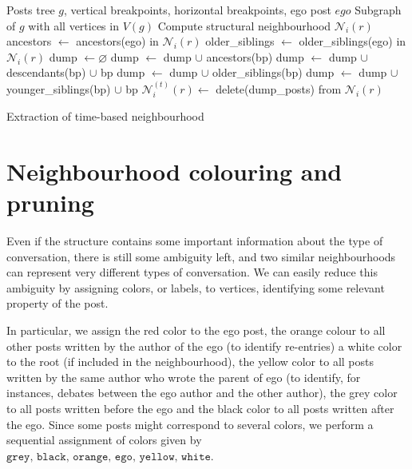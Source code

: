 \documentclass[conference]{IEEEtran}
\begin{document}
\begin{algorithm}[H]
\begin{algorithmic}
\REQUIRE Posts tree $g$, vertical breakpoints, horizontal breakpoints, ego post $ego$
\ENSURE Subgraph of $g$ with all vertices in $V(g)$
\STATE Compute structural neighbourhood $\mathcal{N}_i(r)$
\STATE ancestors $\leftarrow$  ancestors(ego) in $\mathcal{N}_i(r)$
\STATE older\_siblings $\leftarrow$ older\_siblings(ego) in $\mathcal{N}_i(r)$
\STATE dump $\leftarrow \varnothing$
   \STATE dump $\leftarrow$ dump $\cup$ ancestors(bp)
 \ELSE
   \STATE dump $\leftarrow$ dump $\cup$ descendants(bp) $\cup$ bp
  \ENDIF
\ENDFOR
{}
     \STATE dump $\leftarrow$ dump $\cup$ older\_siblings(bp)
   \ELSE
     \STATE dump $\leftarrow$ dump $\cup$ younger\_siblings(bp) $\cup$ bp
  \ENDIF
\ENDFOR
\STATE $\mathcal{N}_i^{(t)}(r) \leftarrow$ delete(dump\_posts) from $\mathcal{N}_i(r)$
\end{algorithmic}
\caption{Extraction of time-based neighbourhood}
\label{alg:temporal_neighbourhood}
\end{algorithm}

\section{Neighbourhood colouring and pruning}\label{sec:colouring_pruning}
Even if the structure contains some important information about the type of conversation, there is still some ambiguity left, and two similar neighbourhoods can represent very different types of conversation. We can easily reduce this ambiguity by assigning colors, or labels, to vertices, identifying some relevant property of the post. 

In particular, we assign the red color to the ego post, the orange colour to all other posts written by the author of the ego (to identify re-entries) a white color to the root (if included in the neighbourhood), the yellow color to all posts written by the same author who wrote the parent of ego (to identify, for instances, debates between the ego author and the other author), the grey color to all posts written before the ego and the black color to all posts written after the ego. Since some posts might correspond to several colors, we perform a sequential assignment of colors given by $\texttt{grey, black, orange, ego, yellow, white}$. 
\end{document}
